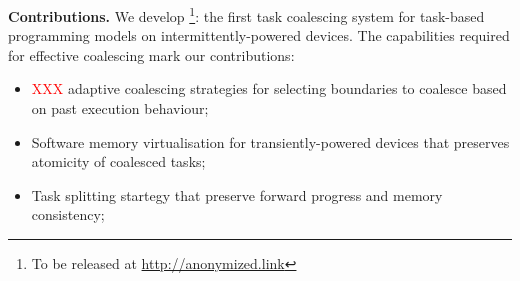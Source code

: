 \textbf{Contributions.} We develop \sys\footnote{To be released at \url{http://anonymized.link}}: the first task coalescing system for task-based programming models on intermittently-powered devices. The capabilities required for effective coalescing mark our contributions:

\begin{itemize}
	\item \textcolor{red}{XXX} adaptive coalescing strategies for selecting boundaries to coalesce based on past execution behaviour;
	\item Software memory virtualisation for transiently-powered devices that preserves atomicity of coalesced tasks;
	\item Task splitting startegy that preserve forward progress and memory consistency;
\end{itemize}




